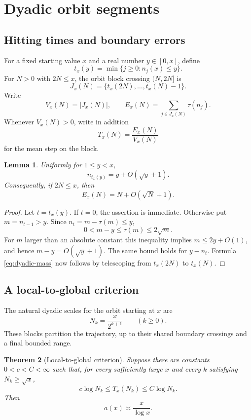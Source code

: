 \documentclass[11pt]{article}
\newtheorem{theorem}{Theorem}[section]
\newtheorem{lemma}[theorem]{Lemma}
\theoremstyle{definition}
\theoremstyle{remark}
\begin{document}
\section{Dyadic orbit segments}\label{sec:dyadic}

\subsection{Hitting times and boundary errors}

For a fixed starting value $x$ and a real number $y\in[0,x]$, define
\[
 t_x(y)=\min\{j\geq0:n_j(x)\leq y\}.
\]
For $N>0$ with $2N\leq x$, the orbit block crossing $(N,2N]$ is
\[
 J_x(N)=\{t_x(2N),\ldots,t_x(N)-1\}.
\]
Write
\[
 V_x(N)=|J_x(N)|,
 \qquad
 E_x(N)=\sum_{j\in J_x(N)}\tau(n_j).
\]
Whenever $V_x(N)>0$, write in addition
\[
 T_x(N)=\frac{E_x(N)}{V_x(N)}
\]
for the mean step on the block.

\begin{lemma}\label{lem:hitting-boundary}
Uniformly for $1\leq y<x$,
\[
 n_{t_x(y)}=y+O(\sqrt y+1).
\]
Consequently, if $2N\leq x$, then
\begin{equation}\label{eq:dyadic-mass}
 E_x(N)=N+O(\sqrt N+1).
\end{equation}
\end{lemma}

\begin{proof}
Let $t=t_x(y)$.  If $t=0$, the assertion is immediate.  Otherwise put
$m=n_{t-1}>y$.  Since $n_t=m-\tau(m)\leq y$,
\[
 0<m-y\leq\tau(m)\leq2\sqrt m.
\]
For $m$ larger than an absolute constant this inequality implies
$m\leq2y+O(1)$, and hence $m-y=O(\sqrt y+1)$.  The same bound holds for
$y-n_t$.  Formula \eqref{eq:dyadic-mass} now follows by telescoping from
$t_x(2N)$ to $t_x(N)$.
\end{proof}

\subsection{A local-to-global criterion}

The natural dyadic scales for the orbit starting at $x$ are
\[
 N_k=\frac{x}{2^{k+1}}\qquad(k\geq0).
\]
These blocks partition the trajectory, up to their shared boundary
crossings and a final bounded range.

\begin{theorem}[Local-to-global criterion]\label{thm:local-global}
Suppose there are constants $0<c<C<\infty$ such that, for every
sufficiently large $x$ and every $k$ satisfying $N_k\geq\sqrt x$,
\begin{equation}\label{eq:local-mean-condition}
 c\log N_k\leq T_x(N_k)\leq C\log N_k.
\end{equation}
Then
\[
 a(x)\asymp\frac{x}{\log x}.
\]
\end{theorem}
\end{document}
